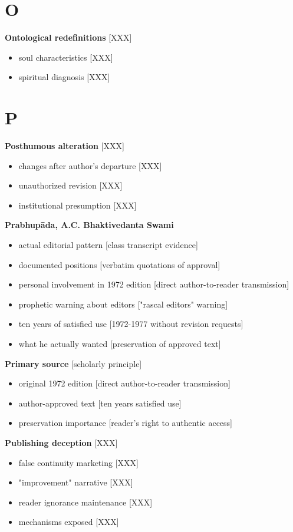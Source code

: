 \documentclass[11pt,twoside]{book}
\begin{document}
\section*{O}
\label{sec:orgb9ef26b}

\textbf{\textbf{Ontological redefinitions}} {[}XXX]
\begin{itemize}
\item soul characteristics [XXX]
\item spiritual diagnosis [XXX]
\end{itemize}
\section*{P}
\label{sec:orgc61d477}

\textbf{\textbf{Posthumous alteration}} {[}XXX]
\begin{itemize}
\item changes after author's departure [XXX]
\item unauthorized revision [XXX]
\item institutional presumption [XXX]
\end{itemize}

\textbf{\textbf{Prabhupāda, A.C. Bhaktivedanta Swami}}
\begin{itemize}
\item actual editorial pattern [class transcript evidence]
\item documented positions [verbatim quotations of approval]
\item personal involvement in 1972 edition [direct author-to-reader transmission]
\item prophetic warning about editors ["rascal editors" warning]
\item ten years of satisfied use [1972-1977 without revision requests]
\item what he actually wanted [preservation of approved text]
\end{itemize}

\textbf{\textbf{Primary source}} {[}scholarly principle]
\begin{itemize}
\item original 1972 edition [direct author-to-reader transmission]
\item author-approved text [ten years satisfied use]
\item preservation importance [reader's right to authentic access]
\end{itemize}

\textbf{\textbf{Publishing deception}} {[}XXX]
\begin{itemize}
\item false continuity marketing [XXX]
\item "improvement" narrative [XXX]
\item reader ignorance maintenance [XXX]
\item mechanisms exposed [XXX]
\end{itemize}
\end{document}
